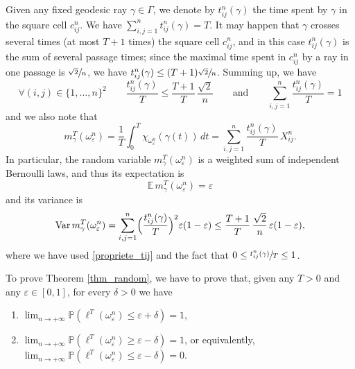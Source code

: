 \documentclass[10pt]{amsart}
\newenvironment{enumeratei}
{\bgroup\def\theenumi{\roman{enumi}}\def\theenumii{\arabic{enumii}}\begin{enumerate}}
{\end{enumerate}\egroup}
\theoremstyle{definition}
\begin{document}
Given any fixed geodesic ray $\gamma\in\Gamma$, we denote by $t_{ij}^n(\gamma)$ the time spent by $\gamma$ in the square cell $c_{ij}^n$. We have $\sum_{i,j=1}^nt_{ij}^n(\gamma)=T$.
It may happen that $\gamma$ crosses several times (at most $T+1$ times) the square cell $c_{ij}^n$, and in this case $t_{ij}^n(\gamma)$ is the sum of several passage times; since the maximal time spent in $c_{ij}^n$ by a ray in one passage is $\sfrac{\sqrt{2}}{n}$, we have $t_{ij}^n(\gamma) \leq (T+1) \sfrac{\sqrt{2}}{n}$.
Summing up, we have
\begin{equation}\label{propriete_tij}
\forall (i,j)\in \{1,\ldots,n\}^2\qquad \frac{t_{ij}^n(\gamma)}{T} \leq \frac{T+1}{T}\, \frac{\sqrt{2}}{n}
\qquad\textrm{and}\qquad
\sum_{i,j=1}^n \frac{t_{ij}^n(\gamma)}{T} = 1
\end{equation}
and we also note that
\begin{equation}\label{18:26}
m^T_\gamma(\omega_\varepsilon^n) = \frac{1}{T} \int_0^{T} \chi_{\omega_\varepsilon^n} (\gamma(t) ) \, dt = \sum_{i,j=1}^n \frac{t_{ij}^n(\gamma)}{T}\, X_{ij}^n.
\end{equation}
In particular, the random variable $m^T_\gamma(\omega_\varepsilon^n)$ is a weighted sum of independent Bernoulli laws, and thus its expectation is
\begin{equation}\label{expectation_m}
\mathbb{E}\,m^T_\gamma(\omega_\varepsilon^n) = \varepsilon
\end{equation}
and its variance is
\begin{equation}\label{variance_m}
\mathrm{Var}\,m^T_\gamma(\omega_\varepsilon^n) = \sum_{i,j=1}^n \Bigl( \frac{t_{ij}^n(\gamma)}{T} \Bigr)^2 \varepsilon(1-\varepsilon)
\leq \frac{T+1}{T}\, \frac{\sqrt{2}}{n}\,\varepsilon(1-\varepsilon),
\end{equation}
where we have used \eqref{propriete_tij} and the fact that $0\leq \sfrac{t_{ij}^n(\gamma)}{T}\leq 1$.

To prove Theorem \ref{thm_random}, we have to prove that, given any $T>0$ and any $\varepsilon\in[0,1]$, for every $\delta>0$ we have
\begin{enumeratei}
\item\label{igd1} $\displaystyle\lim_{n\to +\infty} \mathbb{P}\left( \ell^T(\omega_\varepsilon^n) \leq \varepsilon + \delta \right) = 1$,
\item\label{igd2} $\displaystyle\lim_{n\to +\infty} \mathbb{P}\left( \ell^T(\omega_\varepsilon^n) \geq \varepsilon - \delta \right) = 1$, or equivalently, $\displaystyle\lim_{n\to +\infty} \mathbb{P}\left( \ell^T(\omega_\varepsilon^n) \leq \varepsilon - \delta \right) = 0$.
\end{enumeratei}
\end{document}
